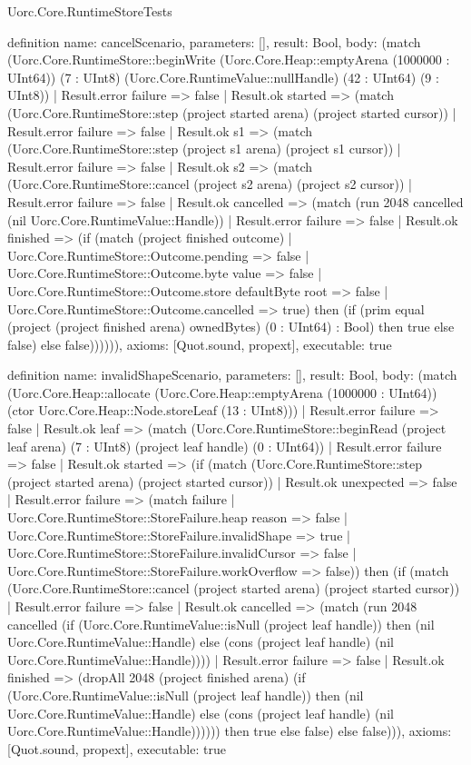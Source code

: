 \begin{lexlean}{Uorc.Core.RuntimeStoreTests}
\begin{semanticmodule}
definition{
  name: cancelScenario,
  parameters: [],
  result: Bool,
  body: (match (Uorc.Core.RuntimeStore::beginWrite (Uorc.Core.Heap::emptyArena (1000000 : UInt64)) (7 : UInt8) (Uorc.Core.RuntimeValue::nullHandle) (42 : UInt64) (9 : UInt8))
    | Result.error failure => false
    | Result.ok started => (match (Uorc.Core.RuntimeStore::step (project started arena) (project started cursor))
      | Result.error failure => false
      | Result.ok s1 => (match (Uorc.Core.RuntimeStore::step (project s1 arena) (project s1 cursor))
        | Result.error failure => false
        | Result.ok s2 => (match (Uorc.Core.RuntimeStore::cancel (project s2 arena) (project s2 cursor))
          | Result.error failure => false
          | Result.ok cancelled => (match (run 2048 cancelled (nil Uorc.Core.RuntimeValue::Handle))
            | Result.error failure => false
            | Result.ok finished => (if (match (project finished outcome)
              | Uorc.Core.RuntimeStore::Outcome.pending => false
              | Uorc.Core.RuntimeStore::Outcome.byte value => false
              | Uorc.Core.RuntimeStore::Outcome.store defaultByte root => false
              | Uorc.Core.RuntimeStore::Outcome.cancelled => true) then (if (prim equal (project (project finished arena) ownedBytes) (0 : UInt64) : Bool) then true else false) else false)))))),
  axioms: [Quot.sound, propext],
  executable: true
}

definition{
  name: invalidShapeScenario,
  parameters: [],
  result: Bool,
  body: (match (Uorc.Core.Heap::allocate (Uorc.Core.Heap::emptyArena (1000000 : UInt64)) (ctor Uorc.Core.Heap::Node.storeLeaf (13 : UInt8)))
    | Result.error failure => false
    | Result.ok leaf => (match (Uorc.Core.RuntimeStore::beginRead (project leaf arena) (7 : UInt8) (project leaf handle) (0 : UInt64))
      | Result.error failure => false
      | Result.ok started => (if (match (Uorc.Core.RuntimeStore::step (project started arena) (project started cursor))
        | Result.ok unexpected => false
        | Result.error failure => (match failure
          | Uorc.Core.RuntimeStore::StoreFailure.heap reason => false
          | Uorc.Core.RuntimeStore::StoreFailure.invalidShape => true
          | Uorc.Core.RuntimeStore::StoreFailure.invalidCursor => false
          | Uorc.Core.RuntimeStore::StoreFailure.workOverflow => false)) then (if (match (Uorc.Core.RuntimeStore::cancel (project started arena) (project started cursor))
        | Result.error failure => false
        | Result.ok cancelled => (match (run 2048 cancelled (if (Uorc.Core.RuntimeValue::isNull (project leaf handle)) then (nil Uorc.Core.RuntimeValue::Handle) else (cons (project leaf handle) (nil Uorc.Core.RuntimeValue::Handle))))
          | Result.error failure => false
          | Result.ok finished => (dropAll 2048 (project finished arena) (if (Uorc.Core.RuntimeValue::isNull (project leaf handle)) then (nil Uorc.Core.RuntimeValue::Handle) else (cons (project leaf handle) (nil Uorc.Core.RuntimeValue::Handle)))))) then true else false) else false))),
  axioms: [Quot.sound, propext],
  executable: true
}


\end{semanticmodule}
\end{lexlean}
